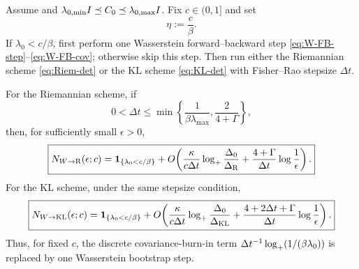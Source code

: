 \begin{theorem}
\label{thm:disc-W-to-FR}
Assume  and
$\lambda_{0,\min}I\preceq C_0\preceq\lambda_{0,\max}I$. Fix $c\in(0,1]$ and set
\[
    \eta:=\frac c\beta.
\]
If $\lambda_0<c/\beta$, first perform one Wasserstein forward--backward step
\eqref{eq:W-FB-step}--\eqref{eq:W-FB-cov}; otherwise skip this step. Then run either the
Riemannian scheme \eqref{eq:Riem-det} or the KL scheme \eqref{eq:KL-det} with Fisher--Rao
stepsize $\Delta t$.

For the Riemannian scheme, if
\[
    0<\Delta t\le\min\left\{\frac1{\beta\lambda_{\max}},\frac2{4+\Gamma}\right\},
\]
then, for sufficiently small $\epsilon>0$,
\[
    \boxed{
    N_{W\to\mathrm{R}}(\epsilon;c)
    =
    \mathbf 1_{\{\lambda_0<c/\beta\}}
    +
    O\!\left(
        \frac{\kappa}{c\Delta t}\log_+\frac{\Delta_0}{\Delta_{\mathrm{R}}}
        +
        \frac{4+\Gamma}{\Delta t}\log\frac1\epsilon
    \right).
    }
\]
For the KL scheme, under the same stepsize condition,
\[
    \boxed{
    N_{W\to\mathrm{KL}}(\epsilon;c)
    =
    \mathbf 1_{\{\lambda_0<c/\beta\}}
    +
    O\!\left(
        \frac{\kappa}{c\Delta t}\log_+\frac{\Delta_0}{\Delta_{\mathrm{KL}}}
        +
        \frac{4+2\Delta t+\Gamma}{\Delta t}\log\frac1\epsilon
    \right).
    }
\]
Thus, for fixed $c$, the discrete covariance-burn-in term
$\Delta t^{-1}\log_+(1/(\beta\lambda_0))$ is replaced by one Wasserstein bootstrap step.
\end{theorem}

